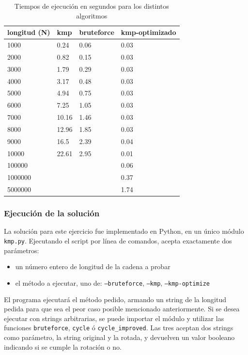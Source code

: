 \documentclass{article}
\begin{document}
\begin{table}[h]
    \begin{center}    

    \begin{tabular}{| l | l | l | l |}
        \hline
        longitud (N) & kmp & bruteforce & kmp-optimizado \\ \hline
        1000 & 0.24 & 0.06 & 0.03 \\ \hline
        2000 & 0.82 & 0.15 & 0.03 \\ \hline
        3000 & 1.79 & 0.29 & 0.03 \\ \hline
        4000 & 3.17 & 0.48 & 0.03 \\ \hline
        5000 & 4.94 & 0.75 & 0.03 \\ \hline
        6000 & 7.25 & 1.05 & 0.03 \\ \hline
        7000 & 10.16 & 1.46 & 0.03 \\ \hline
        8000 & 12.96 & 1.85 & 0.03 \\ \hline
        9000 & 16.5 & 2.39 & 0.04 \\ \hline
        10000 & 22.61 & 2.95 & 0.01 \\ \hline
        100000 &  &  & 0.06 \\ \hline
        1000000 &  &  & 0.37 \\ \hline
        5000000 &  &  & 1.74 \\ \hline
    \end{tabular}
    \caption{Tiempos de ejecución en segundos para los distintos algoritmos}
\end{center}
\end{table}

\subsubsection{Ejecución de la solución}
La solución para este ejercicio fue implementado en Python, en un único módulo \texttt{kmp.py}. Ejecutando el script por línea de comandos, acepta exactamente dos parámetros:
\begin{itemize}
    \item un número entero de longitud de la cadena a probar
    \item el método a ejecutar, uno de: \texttt{--bruteforce}, \texttt{--kmp}, \texttt{--kmp-optimize}
\end{itemize}
El programa ejecutará el método pedido, armando un string de la longitud pedida para que sea el peor caso posible mencionado anteriormente. Si se desea ejecutar con strings arbitrarias, se puede importar el módulo y utilizar las funciones \texttt{bruteforce}, \texttt{cycle} ó \texttt{cycle\_improved}. Las tres aceptan dos strings como parámetro, la string original y la rotada, y devuelven un valor booleano indicando si se cumple la rotación o no.
\end{document}
